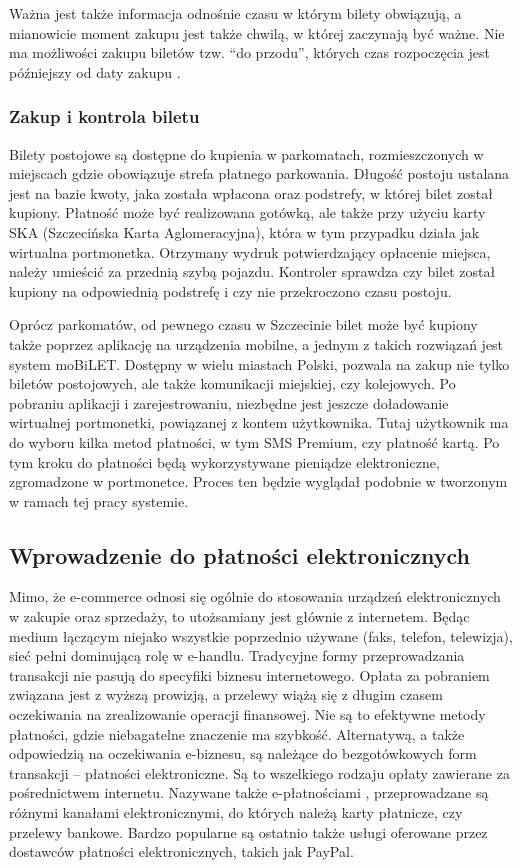 Ważna jest także informacja odnośnie czasu w którym bilety obwiązują, a mianowicie moment zakupu jest także chwilą, w której zaczynają być ważne. Nie ma możliwości zakupu biletów tzw. ``do przodu'', których czas rozpoczęcia jest późniejszy od daty zakupu \cite{sumowanie}. 

\subsubsection*{Zakup i kontrola biletu}

Bilety postojowe są dostępne do kupienia w parkomatach, rozmieszczonych w miejscach gdzie obowiązuje strefa płatnego parkowania. Długość postoju ustalana jest na bazie kwoty, jaka została wpłacona oraz podstrefy, w której bilet został kupiony. Płatność może być realizowana gotówką, ale także przy użyciu karty SKA (Szczecińska Karta Aglomeracyjna), która w tym przypadku działa jak wirtualna portmonetka. Otrzymany wydruk potwierdzający opłacenie miejsca, należy umieścić za przednią szybą pojazdu. Kontroler sprawdza czy bilet został kupiony na odpowiednią podstrefę i czy nie przekroczono czasu postoju.

Oprócz parkomatów, od pewnego czasu w Szczecinie bilet może być kupiony także poprzez aplikację na urządzenia mobilne, a jednym z takich rozwiązań jest system moBiLET. Dostępny w wielu miastach Polski, pozwala na zakup nie tylko biletów postojowych, ale także komunikacji miejskiej, czy kolejowych. Po pobraniu aplikacji i zarejestrowaniu, niezbędne jest jeszcze doładowanie wirtualnej portmonetki, powiązanej z kontem użytkownika. Tutaj użytkownik ma do wyboru kilka metod płatności, w tym SMS Premium, czy płatność kartą. Po tym kroku do płatności będą wykorzystywane pieniądze elektroniczne, zgromadzone w portmonetce. Proces ten będzie wyglądał podobnie w tworzonym w ramach tej pracy systemie.

\subsection{Wprowadzenie do płatności elektronicznych}

Mimo, że e-commerce odnosi się ogólnie do stosowania urządzeń elektronicznych w zakupie oraz sprzedaży, to utożsamiany jest głównie z internetem. Będąc medium łączącym niejako wszystkie poprzednio używane (faks, telefon, telewizja), sieć pełni dominującą rolę w e-handlu. Tradycyjne formy przeprowadzania transakcji nie pasują do specyfiki biznesu internetowego. Opłata za pobraniem związana jest z wyższą prowizją, a przelewy wiążą się z długim czasem oczekiwania na zrealizowanie operacji finansowej. Nie są to efektywne metody płatności, gdzie niebagatelne znaczenie ma szybkość. Alternatywą, a także odpowiedzią na oczekiwania e-biznesu, są należące do bezgotówkowych form transakcji -- płatności elektroniczne. Są to wszelkiego rodzaju opłaty zawierane za pośrednictwem internetu. Nazywane także e-płatnościami 
\cite{elektroniczne_metody_platnosci}, przeprowadzane są różnymi kanałami 
elektronicznymi, do których należą karty płatnicze, czy przelewy bankowe. 
Bardzo popularne są ostatnio także usługi oferowane przez dostawców płatności 
elektronicznych, takich jak PayPal.


